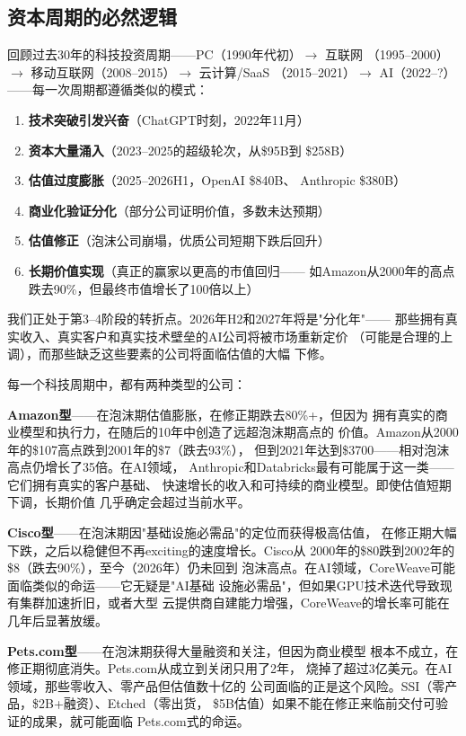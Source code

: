 \subsection{资本周期的必然逻辑}
\label{subsec:fund-cycle}

回顾过去30年的科技投资周期——PC（1990年代初）$\to$ 互联网
（1995--2000）$\to$ 移动互联网（2008--2015）$\to$ 云计算/SaaS
（2015--2021）$\to$ AI（2022--?）——每一次周期都遵循类似的模式：

\begin{enumerate}
  \item \textbf{技术突破引发兴奋}（ChatGPT时刻，2022年11月）
  \item \textbf{资本大量涌入}（2023--2025的超级轮次，从\$95B到
    \$258B）
  \item \textbf{估值过度膨胀}（2025--2026H1，OpenAI \$840B、
    Anthropic \$380B）
  \item \textbf{商业化验证分化}（部分公司证明价值，多数未达预期）
  \item \textbf{估值修正}（泡沫公司崩塌，优质公司短期下跌后回升）
  \item \textbf{长期价值实现}（真正的赢家以更高的市值回归——
    如Amazon从2000年的高点跌去90\%，但最终市值增长了100倍以上）
\end{enumerate}

我们正处于第3--4阶段的转折点。2026年H2和2027年将是"分化年"——
那些拥有真实收入、真实客户和真实技术壁垒的AI公司将被市场重新定价
（可能是合理的上调），而那些缺乏这些要素的公司将面临估值的大幅
下修。

每一个科技周期中，都有两种类型的公司：

\textbf{Amazon型}——在泡沫期估值膨胀，在修正期跌去80\%+，但因为
拥有真实的商业模型和执行力，在随后的10年中创造了远超泡沫期高点的
价值。Amazon从2000年的\$107高点跌到2001年的\$7（跌去93\%），
但到2021年达到\$3700——相对泡沫高点仍增长了35倍。在AI领域，
Anthropic和Databricks最有可能属于这一类——它们拥有真实的客户基础、
快速增长的收入和可持续的商业模型。即使估值短期下调，长期价值
几乎确定会超过当前水平。

\textbf{Cisco型}——在泡沫期因"基础设施必需品"的定位而获得极高估值，
在修正期大幅下跌，之后以稳健但不再exciting的速度增长。Cisco从
2000年的\$80跌到2002年的\$8（跌去90\%），至今（2026年）仍未回到
泡沫高点。在AI领域，CoreWeave可能面临类似的命运——它无疑是"AI基础
设施必需品"，但如果GPU技术迭代导致现有集群加速折旧，或者大型
云提供商自建能力增强，CoreWeave的增长率可能在几年后显著放缓。

\textbf{Pets.com型}——在泡沫期获得大量融资和关注，但因为商业模型
根本不成立，在修正期彻底消失。Pets.com从成立到关闭只用了2年，
烧掉了超过3亿美元。在AI领域，那些零收入、零产品但估值数十亿的
公司面临的正是这个风险。SSI（零产品，\$2B+融资）、Etched（零出货，
\$5B估值）如果不能在修正来临前交付可验证的成果，就可能面临
Pets.com式的命运。


